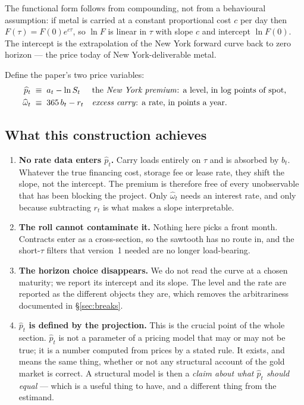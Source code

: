 \documentclass[11pt,a4paper]{article}
\newcommand{\phat}{\widehat{p}_t}
\newcommand{\omhat}{\widehat{\omega}_t}
\begin{document}
The functional form follows from compounding, not from a behavioural
assumption: if metal is carried at a constant proportional cost $c$ per day
then $F(\tau)=F(0)e^{c\tau}$, so $\ln F$ is linear in $\tau$ with slope $c$ and
intercept $\ln F(0)$. The intercept is the extrapolation of the New York
forward curve back to zero horizon --- the price today of New York-deliverable
metal.

Define the paper's two price variables:
\begin{align}
\phat &\;\equiv\; a_t - \ln S_t
  &&\text{the \emph{New York premium}: a level, in log points of spot,}\label{eq:phat}\\
\omhat &\;\equiv\; 365\,b_t - r_t
  &&\text{\emph{excess carry}: a rate, in points a year.}\label{eq:omhat}
\end{align}

\subsection*{What this construction achieves}

\begin{enumerate}[leftmargin=1.4em,itemsep=3pt,topsep=2pt]
\item \textbf{No rate data enters $\phat$.} Carry loads entirely on $\tau$ and
is absorbed by $b_t$. Whatever the true financing cost, storage fee or lease
rate, they shift the slope, not the intercept. The premium is therefore free of
every unobservable that has been blocking the project. Only $\omhat$ needs an
interest rate, and only because subtracting $r_t$ is what makes a slope
interpretable.
\item \textbf{The roll cannot contaminate it.} Nothing here picks a front
month. Contracts enter as a cross-section, so the sawtooth has no route in, and
the short-$\tau$ filters that version~1 needed are no longer load-bearing.
\item \textbf{The horizon choice disappears.} We do not read the curve at a
chosen maturity; we report its intercept and its slope. The level and the rate
are reported as the different objects they are, which removes the arbitrariness
documented in \S\ref{sec:breaks}.
\item \textbf{$\phat$ is defined by the projection.} This is the crucial point
of the whole section. $\phat$ is not a parameter of a pricing model that may or
may not be true; it is a number computed from prices by a stated rule. It
exists, and means the same thing, whether or not any structural account of the
gold market is correct. A structural model is then a \emph{claim about what
$\phat$ should equal} --- which is a useful thing to have, and a different
thing from the estimand.
\end{enumerate}
\end{document}

